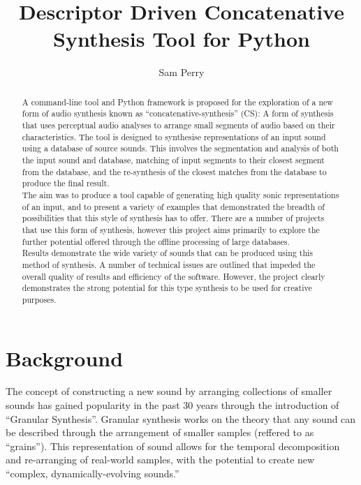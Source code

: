 \documentclass{scrartcl}
\begin{document}
    \title{Descriptor Driven Concatenative Synthesis Tool for Python}
    \author{Sam Perry}

    \maketitle

    \begin{abstract} 
    A command-line tool and Python framework is proposed for the exploration of
    a new form of audio synthesis known as ``concatenative-synthesis'' (CS): A
    form of synthesis that uses perceptual audio analyses to arrange small
    segments of audio based on their characteristics.  The tool is designed to
    synthesise representations of an input sound using a database of source
    sounds. This involves the segmentation and analysis of both the input sound
    and database, matching of input segments to their closest segment from the
    database, and the re-synthesis of the closest matches from the database to
    produce the final result.\\

    The aim was to produce a tool capable of generating high quality sonic
    representations of an input, and to present a variety of examples that
    demonstrated the breadth of possibilities that this style of synthesis has
    to offer. There are a number of projects that use this form of synthesis,
    however this project aims primarily to explore the further potential
    offered through the offline processing of large databases.\\

    Results demonstrate the wide variety of sounds that can be produced using
    this method of synthesis. A number of technical issues are outlined that
    impeded the overall quality of results and efficiency of the software.
    However, the project clearly demonstrates the strong potential for this
    type synthesis to be used for creative purposes.
    \end{abstract}

    \section*{Background}
    The concept of constructing a new sound by arranging collections of smaller
    sounds has gained popularity in the past 30 years through the introduction
    of ``Granular Synthesis''. Granular synthesis works on the theory that any
    sound can be described through the arrangement of smaller samples (reffered
    to as ``grains''). This representation of sound allows for the temporal
    decomposition and re-arranging of real-world samples, with the potential to
    create new ``complex, dynamically-evolving
    sounds.''~\parencite[p.1]{Roads1988}\\
\end{document}
